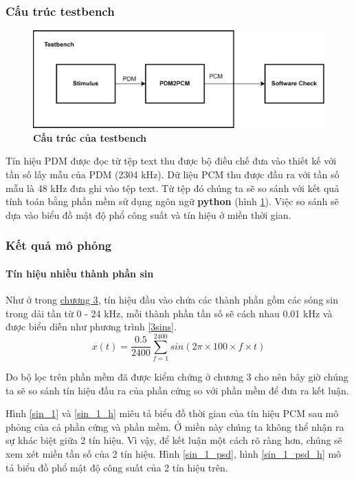 \subsubsection{Cấu trúc testbench}
\begin{figure}[H]
    \centering
    \includegraphics[width=13cm]{Images/Chuong4/tb/tb_top.png}
    \caption[Cấu trúc của testbench]{\bfseries \fontsize{12pt}{0pt}\selectfont  Cấu trúc của testbench}
    \label{tb_top}
\end{figure}

Tín hiệu PDM được đọc từ tệp text thu được bộ điều chế đưa vào thiết kế với tần số lấy mẫu của PDM (2304 kHz). Dữ liệu PCM thu được đầu ra với tần số mẫu là 48 kHz đưa ghi vào tệp text. Từ tệp đó chúng ta sẽ so sánh với kết quả tính toán bằng phần mềm sử dụng ngôn ngữ \textbf{python} (hình \ref{tb_top}). Việc so sánh sẽ dựa vào biểu đồ mật độ phổ công suất và tín hiệu ở miền thời gian.

\subsubsection{Kết quả mô phỏng}
\paragraph{Tín hiệu nhiều thành phần sin}
Như ở trong \hyperref[chuong3]{chương 3}, tín hiệu đầu vào chứa các thành phần gồm các sóng sin trong dải tần từ 0 - 24 kHz, mỗi thành phần tần số sẽ cách nhau 0.01 kHz và được biểu diễn như phương trình \ref{3sins}.
\begin{equation} \label{3sins}
    x(t) = \frac{0.5}{2400}\sum^{2400}_{f = 1}sin(2\pi \times 100 \times f \times t)
\end{equation}

Do bộ lọc trên phần mềm đã được kiểm chứng ở chương 3 cho nên bây giờ chúng ta sẽ so sánh tín hiệu đầu ra của phần cứng so với phần mềm để đưa ra kết luận.


Hình \ref{sin_1} và \ref{sin_1_h} miêu tả biểu đồ thời gian của tín hiệu PCM sau mô phỏng của cả phần cứng và phần mềm. Ở miền này chúng ta không thể nhận ra sự khác biệt giữa 2 tín hiệu. Vì vậy, để kết luận một cách rõ ràng hơn, chúng sẽ xem xét miền tần số của 2 tín hiệu. Hình \ref{sin_1_psd}, hình \ref{sin_1_psd_h} mô tả biểu đồ phổ mật độ công suất của 2 tín hiệu trên.

